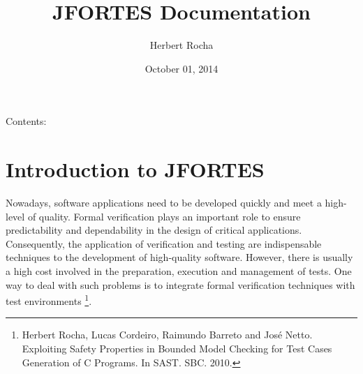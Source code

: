 \documentclass[letterpaper,10pt,english]{sphinxmanual}
\title{JFORTES Documentation}
\date{October 01, 2014}
\author{Herbert Rocha}
\begin{document}
\maketitle
\tableofcontents
{}\label{index::doc}


Contents:


\chapter{Introduction to JFORTES}
\label{sections/intro:introduction-to-jfortes}\label{sections/intro:welcome-to-jfortes-s-documentation}\label{sections/intro::doc}
Nowadays, software applications need to be developed quickly and meet a high-level
of quality. Formal verification plays an important role to ensure predictability and dependability
in the design of critical applications. Consequently, the application of verification and testing are
indispensable techniques to the development of high-quality
software. However, there is usually a high cost involved in the preparation, execution
and management of tests. One way to deal with such problems is to integrate formal verification
techniques with test environments \footnote{
Herbert Rocha, Lucas Cordeiro, Raimundo Barreto and José Netto. Exploiting Safety Properties in Bounded Model
Checking for Test Cases Generation of C Programs. In SAST. SBC. 2010.
}.
\end{document}
